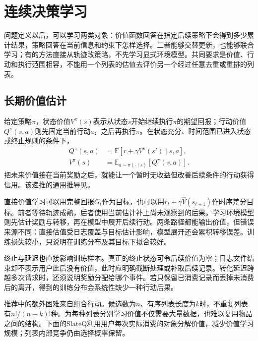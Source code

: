 \section{连续决策学习}
\label{sec:rs-sequential-learning}

问题定义以后，可以学习两类对象：价值函数回答在指定后续策略下会得到多少累计结果，策略回答在当前信息和约束下怎样选择。二者能够交替更新，也能够联合学习；有的方法直接从轨迹改策略，不先学习显式环境模型。共同要求是价值、行动和执行范围相容，不能用一个列表的估值去评价另一个经过任意去重或重排的列表。

\subsection{长期价值估计}
\label{sec:rs-long-term-estimation}

给定策略$\pi$，状态价值$V^\pi(s)$表示从状态$s$开始继续执行$\pi$的期望回报；行动价值$Q^\pi(s,a)$则先固定当前行动$a$，之后再执行$\pi$。在状态充分、时间范围已进入状态或终止规则的条件下，
\begin{equation}
 \begin{aligned}
 Q^\pi(s,a)
   &=\mathbb{E}[r+\gamma V^\pi(s')\mid s,a],\\
 V^\pi(s)
   &=\mathbb{E}_{a\sim\pi(\cdot\mid s)}[Q^\pi(s,a)].
 \end{aligned}
 \label{eq:rs-policy-value}
\end{equation}
把未来价值接在当前奖励之后，就能让一个暂时无收益但改善后续条件的行动获得信用。该递推的通用推导见。

直接价值学习可以用完整回报$G_t$作为目标，也可以用$r_t+\gamma\widehat V(s_{t+1})$作时序差分目标。前者等待轨迹成熟，后者使用当前估计补上尚未观察到的后果。学习环境模型则先估计奖励与转移，再在模型中展开后续行动。两条路径都能输出价值，但错误来源不同：直接估值受日志覆盖与目标估计影响，模型展开还会累积转移误差。训练损失较小，只说明在训练分布及其目标下拟合较好。

终止与延迟也直接影响训练样本。真正的终止状态可令后续价值为零；日志文件结束却不表示用户此后没有价值，此时应明确截断处理或补取后续记录。转化延迟跨越多次请求时，还须说明奖励分配给哪个事件。若只保留已消费记录而丢掉未消费后的离开，得到的训练分布会系统性缺少一种行动后果。

推荐中的额外困难来自组合行动。候选数为$n$、有序列表长度为$k$时，不重复列表有$n!/(n-k)!$种。为每种列表分别学习价值不仅需要大量数据，也难以复用物品之间的结构。下面的SlateQ利用用户每次实际消费的对象分解价值，减少价值学习规模；列表内部竞争仍由选择概率保留。

